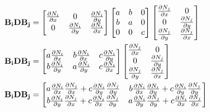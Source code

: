 \begin{equation}
	\begin{split}
&\mathbf{B_i} \mathbf{D} \mathbf{B_j}
	=
	\begin{bmatrix}
		\mdp{N_i}{x} & 0             & \mdp{N_i}{y}\\ 
		0            & \mdp{N_i}{y}  & \mdp{N_i}{x}
	\end{bmatrix}
	\begin{bmatrix}
		a & b& 0\\ 
		b & a& 0\\ 
		0 & 0& c\\ 
	\end{bmatrix}
	\begin{bmatrix}
	\mdp{N_j}{x} & 0\\ 
	0            & \mdp{N_j}{y}\\
 	\mdp{N_j}{y} & \mdp{N_j}{x}
	\end{bmatrix}\\
&\mathbf{B_i} \mathbf{D} \mathbf{B_j}
	=
	\begin{bmatrix}
		a \mdp{N_i}{x} & 	b \mdp{N_i}{x} & c \mdp{N_i}{y}\\ 
		b \mdp{N_i}{y} & 	a \mdp{N_i}{y} & c \mdp{N_i}{x}
	\end{bmatrix}
	\begin{bmatrix}
		\mdp{N_j}{x} & 0\\ 
		0            & \mdp{N_j}{y}\\
		\mdp{N_j}{y} & \mdp{N_j}{x}
	\end{bmatrix}\\
&\mathbf{B_i} \mathbf{D} \mathbf{B_j}
=
\begin{bmatrix}
	a \mdp{N_i}{x}\mdp{N_j}{x} + c \mdp{N_i}{y}\mdp{N_j}{y} & 	b \mdp{N_i}{x}\mdp{N_i}{y} + c \mdp{N_i}{y}\mdp{N_j}{y}\\ 
	b \mdp{N_i}{y}\mdp{N_j}{x} + c \mdp{N_i}{x}\mdp{N_j}{y} & 	a \mdp{N_i}{y}\mdp{N_j}{y} + c \mdp{N_i}{x}\mdp{N_j}{x}
\end{bmatrix}
\end{split}
\end{equation}